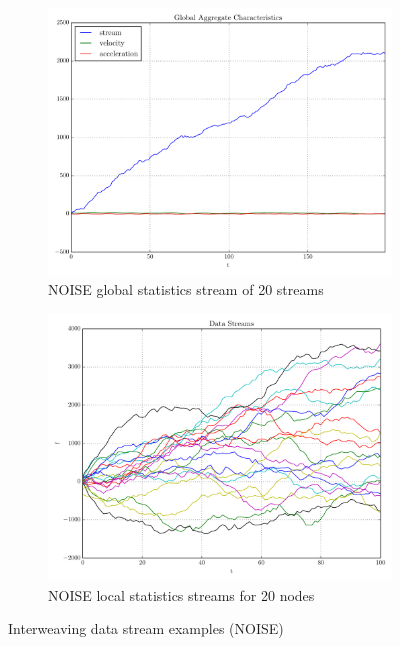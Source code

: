 \begin{figure}[t!]
\centering
\begin{subfigure}[t]{0.49\textwidth}
\centering
\includegraphics[scale=0.38, trim=2cm 0 0 0]{img/noisyinterweaving1D20N_global.pdf}
\caption{NOISE global statistics stream of 20 streams}
\end{subfigure}
\begin{subfigure}[t]{0.49\textwidth}
\centering
\includegraphics[scale=0.38]{img/noisyinterweaving1D20N_streams.pdf}
\caption{NOISE local statistics streams for 20 nodes} 
\end{subfigure}
\vspace{0.5cm}
\caption{Interweaving data stream examples (NOISE)}\label{fig:noiseStreams}
\end{figure}


